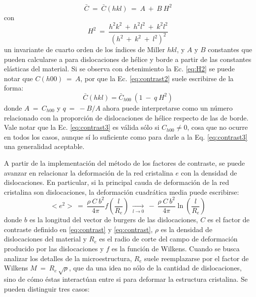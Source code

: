 \begin{equation}
  \bar{C} \ = \ \bar{C}(hkl) \ = \ A \ + \ B \ H^2
  \label{eq:contrast2}
\end{equation}
\noindent
con
\begin{equation}
  H^2 \ = \ \frac{h^2k^2 \ + \ h^2l^2 \ + \ k^2l^2}{(h^2 \ + \ k^2 \ + \ l^2)^2}
  \label{eq:H2}
\end{equation}
\noindent
un invariante de cuarto orden de los índices de Miller $hkl$, y $A$ y $B$ constantes que pueden calcularse a para dislocaciones de hélice y borde a partir de las constantes elásticas del material.
Si se observa con detenimiento la Ec. \ref{eq:H2} se puede notar que $C(h00) \ = \ A$, por que la Ec. \ref{eq:contrast2} suele escribirse de la forma:
\begin{equation}
  \bar{C}(hkl) = \bar{C}_{h00}\ (1 \ - \ q\ H^2)
  \label{eq:contrast3}
\end{equation}
\noindent
donde $A \ = \ C_{h00}$ y $q \ = \ -B/A$ ahora puede interpretarse como un número relacionado con la proporción de dislocaciones de hélice respecto de las de borde.
Vale notar que la Ec. \ref{eq:contrast3} es válida sólo si $C_{h00} \neq 0$, cosa que no ocurre en todos los casos, aunque sí lo suficiente como para darle a la Eq. \ref{eq:contrast3} una generalidad aceptable.

A partir de la implementación del método de los factores de contraste, se puede avanzar en relacionar la deformación de la red cristalina $e$ con la densidad de dislocaciones. En particular, si la principal cauda de deformación de la red cristalina son dislocaciones, la deformación cuadrática media puede escribirse\cite{Wilkens1970}:
\begin{equation}
  <e^2> \ = \ \frac{\rho \ C \ b^2}{4 \pi} f\left(\frac{l}{R_e}\right) \ \xrightarrow[l \to 0]{} \ - \ \frac{\rho \ C \ b^2}{4 \pi} \ln \left(\frac{l}{R_e}\right)
  \label{eq:Wilkens}
\end{equation}
\noindent
donde $b$ es la longitud del vector de burgers de las dislocaciones, $C$ es el factor de contraste definido en \ref{eq:contrast} y \ref{eq:contrast}, $\rho$ es la densidad de dislocaciones del material y $R_e$ es el radio de corte del campo de deformación producido por las dislocaciones y $f$ es la función de Wilkens. 
Cuando se busca analizar los detalles de la microestructura, $R_e$ suele reemplazarse por el factor de Wilkens $M \ = \ R_e\,\sqrt{\rho}$, que da una idea no sólo de la cantidad de dislocaciones, sino de cómo éstas interactúan entre si para deformar la estructura cristalina. Se pueden distinguir tres casos:

